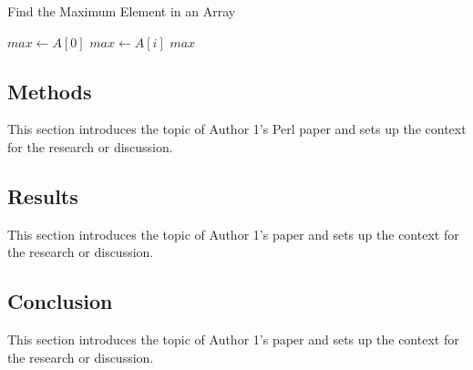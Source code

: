 \begin{algorithm}[H] %
\caption{Find the Maximum Element in an Array}
\label{alg:find_max} %
\begin{algorithmic}[1] %
    \State $max \gets A[0]$ 
     
         
            \State $max \gets A[i]$ 
        \EndIf
    \EndFor
    \State \Return $max$ 
\EndProcedure
\end{algorithmic}
\end{algorithm}

\subsection{Methods}
This section introduces the topic of Author 1's Perl \cite{Wall1996} paper and sets up the context for the research or discussion.

\lipsum[3-4] %

\subsection{Results}
This section introduces the topic of Author 1's paper and sets up the context for the research or discussion.

\lipsum[5-6] %


\subsection{Conclusion}
This section introduces the topic of Author 1's paper and sets up the context for the research or discussion.

\lipsum[7-8] %


